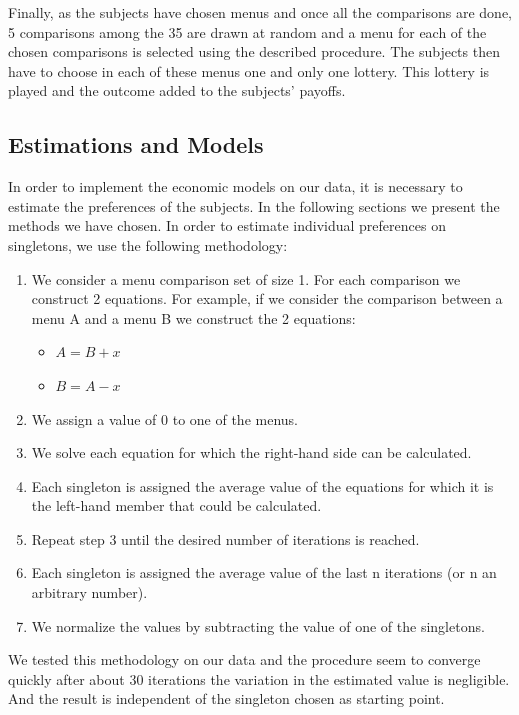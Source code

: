 \documentclass[
]{book}
\providecommand{\tightlist}{%
  \setlength{\itemsep}{0pt}\setlength{\parskip}{0pt}}
\begin{document}
Finally, as the subjects have chosen menus and once all the comparisons are
done, 5 comparisons among the 35 are drawn at random and a menu for each of
the chosen comparisons is selected using the described procedure.
The subjects then have to choose in each of these menus one and only one lottery.
This lottery is played and the outcome added to the subjects' payoffs.

\hypertarget{estimations-and-models}{%
\subsection{Estimations and Models}\label{estimations-and-models}}

In order to implement the economic models on our data, it is necessary to
estimate the preferences of the subjects. In the following sections we present
the methods we have chosen.
In order to estimate individual preferences on singletons, we use the following
methodology:

\begin{enumerate}
\def\labelenumi{\arabic{enumi}.}
\tightlist
\item
  We consider a menu comparison set of size 1.
  For each comparison we construct 2 equations.
  For example, if we consider the comparison between a menu A and a menu B we
  construct the 2 equations:

  \begin{itemize}
  \tightlist
  \item
    \(A = B + x\)
  \item
    \(B = A - x\)
  \end{itemize}
\item
  We assign a value of 0 to one of the menus.
\item
  We solve each equation for which the right-hand side can be calculated.
\item
  Each singleton is assigned the average value of the equations for which it is
  the left-hand member that could be calculated.
\item
  Repeat step 3 until the desired number of iterations is reached.
\item
  Each singleton is assigned the average value of the last n iterations (or n
  an arbitrary number).
\item
  We normalize the values by subtracting the value of one of the singletons.
\end{enumerate}

We tested this methodology on our data and the procedure seem to converge
quickly after about 30 iterations the variation in the estimated value is
negligible.
And the result is independent of the singleton chosen as starting point.
\end{document}

